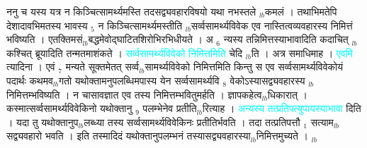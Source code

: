 \documentclass[article,12pt,a4paper]{memoir}%
\newcommand{\quotelemma}[1]{\textcolor{cyan}{#1}}
\newcounter{parCount}
\begin{document}
	  
	  \pstart \leavevmode%
	ननु च यस्य यत्र न किञ्चित्सामर्थ्यमस्ति तदसद्व्यवहारविषयो यथा नभस्तले {\tiny $_{lb}$}कमलं । तथाभिमतेपि देशादावभिमतस्य भावस्य {\tiny $_{5}$} न किञ्चित्सामर्थ्यमस्तीति {\tiny $_{lb}$}सर्व्वसामर्थ्यविवेक एव नास्तित्वव्यवहारस्य निमित्तं भविष्यति । एतक्तिमसं{\tiny $_{lb}$}बद्धमेवोद्घाटितशिरोभिरभिधीयते । अ {\tiny $_{6}$} न्यस्य तन्निमित्तस्याभावादिति कदाचित् {\tiny $_{lb}$}कश्चित् ब्रूयादिति तन्मतमाशंकते । \quotelemma{सर्व्वसामर्थ्यविवेको निमित्तमिति} \cite[2b2]{vn-msN} चेदि {\tiny $_{lb}$}ति । अत्र समाधिमाह । \quotelemma{एवमि} \cite[2b2]{vn-msN} त्यादिना । एवं {\tiny $_{7}$} मन्यते सूक्तमेतत् सर्व्व{\tiny $_{lb}$}सामर्थ्यविवेको निमित्तमिति किन्तु स एव सर्व्वसामर्थ्यविवेकोयं पदार्थः कथमव{\tiny $_{lb}$}गतो यथोक्तामनुपलब्धिमपास्य येन सर्व्वसामर्थ्यवि {\tiny $_{8}$} वेकोऽस्यासद्व्यवहारस्य {\tiny $_{lb}$}निमित्तम्भविष्यति । न चासावज्ञात एव तस्य निमित्तम्भवितुमर्हति । ज्ञापकहेत्व{\tiny $_{lb}$}धिकारात् । कस्मात्सर्व्वसामर्थ्यविवेकिनो यथोक्तानु {\tiny $_{9}$} \leavevmode{} पलम्भेनेव प्रतीति{\tiny $_{lb}$}रित्याह । \quotelemma{अन्यस्य तत्प्रतिपत्युपायस्याभावा} \cite[2b3]{vn-msN} दिति । यदा तु यथोक्तानुप{\tiny $_{lb}$}लब्ध्या तस्य सर्व्वसामर्थ्यविवेकिनः प्रतीतिर्भवति । तदा तत्प्रतिपत्तौ {\tiny $_{1}$} सत्याम{\tiny $_{lb}$}सद्व्यवहारो भवति । इति तस्मादिदं यथोक्तानुपलम्भनं तस्यासद्व्यवहारस्या{\tiny $_{lb}$}निमित्तमुच्यते ।
	{}
	\pend%
      {\tiny $_{lb}$}
\end{document}
